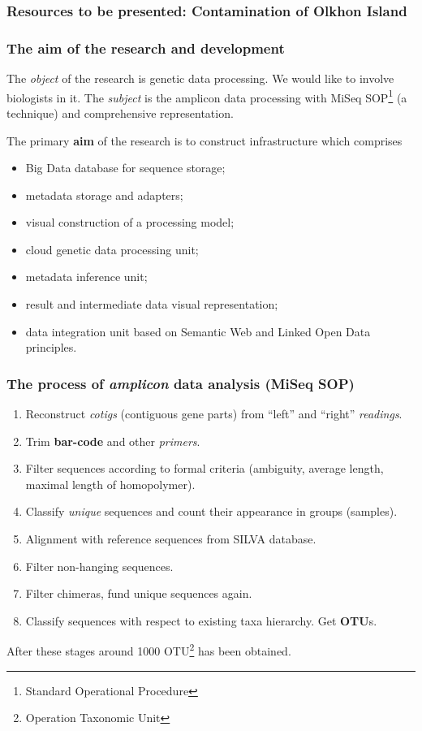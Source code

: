 \documentclass[10pt]{beamer}
\begin{document}
\begin{frame}
  \frametitle{Resources to be presented:  Contamination of  Olkhon Island}
\end{frame}


\begin{frame}
  \frametitle{The aim of the research and development}

  The \emph{object} of the research is genetic data processing. We would like to involve biologists in it. The \emph{subject} is the amplicon data processing with MiSeq SOP\footnote{Standard Operational Procedure} (a technique) and comprehensive representation.

  The primary \textbf{aim} of the research is to construct infrastructure which comprises
  \begin{itemize}
  \item Big Data database for sequence storage;
  \item metadata storage and adapters;
  \item visual construction of a processing model;
  \item cloud genetic data processing unit;
  \item metadata inference unit;
  \item result and intermediate data visual representation;
  \item data integration unit based on Semantic Web and Linked Open Data principles.
  \end{itemize}

\end{frame}

\begin{frame}
  \frametitle{The process of \emph{amplicon} data analysis (MiSeq SOP)}
  \begin{enumerate}
  \item Reconstruct \emph{cotigs} (contiguous gene parts) from ``left'' and ``right'' \emph{readings}.
  \item Trim \textbf{bar-code} and other \emph{primers}.
  \item Filter sequences according to formal criteria (ambiguity, average length, maximal length of homopolymer).
  \item Classify \emph{unique} sequences and count their appearance in groups (samples).
  \item Alignment with reference sequences from SILVA database.
  \item Filter non-hanging sequences.
  \item Filter chimeras, fund unique sequences again.
  \item Classify sequences with respect to existing taxa hierarchy. Get \textbf{OTU}s.
  \end{enumerate}

  After these stages around 1000 OTU\footnote{Operation Taxonomic Unit} has been obtained.

\end{frame}
\end{document}
